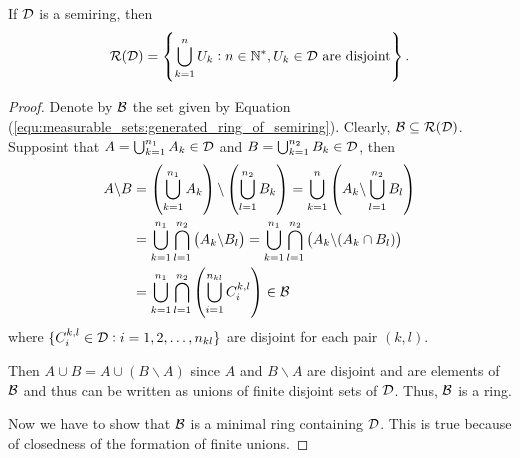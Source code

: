 \begin{thm}
If $\mathcal{D}$ is a semiring, then 
\begin{equation}
    \label{equ:measurable_sets:generated_ring_of_semiring}
    \mathcal{R}(\mathcal{D}) = \left\{ \bigcup_{k=1}^n U_k: 
    n \in \mathbb{N}^\ast, 
    U_k \in \mathcal{D} \text{ are disjoint} \right\}. 
\end{equation}
\end{thm}
\begin{proof}
Denote by $\mathcal{B}$ the set given by Equation 
(\ref{equ:measurable_sets:generated_ring_of_semiring}).
Clearly, $\mathcal{B} \subseteq \mathcal{R}(\mathcal{D})$. 
Supposint that $A = \bigcup_{k=1}^{n_1} A_k \in \mathcal{D}$ and 
$B = \bigcup_{k=1}^{n_2} B_k \in \mathcal{D}$, then 
\begin{equation*}
    \begin{aligned}
        A \backslash B 
        &= \left( \bigcup_{k=1}^{n_1}A_k \right) \backslash
        \left( \bigcup_{l=1}^{n_2}B_k \right) 
        = \bigcup_{k=1}^n \left( 
        A_k \backslash \bigcup_{l=1}^{n_2} B_l\right) \\
        &= \bigcup_{k=1}^{n_1} \bigcap_{l=1}^{n_2} 
        \left( A_k \backslash B_l \right) 
        = \bigcup_{k=1}^{n_1} \bigcap_{l=1}^{n_2} 
        \left( A_k \backslash (A_k \cap B_l) \right) \\ 
        &= \bigcup_{k=1}^{n_1} \bigcap_{l=1}^{n_2} 
        \left( \bigcup_{i=1}^{n_{kl}} C_i^{k, l} \right)
        \in \mathcal{B}
    \end{aligned}
\end{equation*}
where $\{C_i^{k, l} \in \mathcal{D} : i = 1, 2, \ldots, n_{kl}\}$ are disjoint for 
each pair $(k, l)$. 

Then $A \cup B = A \cup (B \backslash A)$ since $A$ and $B \backslash A$ 
are disjoint and are elements of $\mathcal{B}$ and thus can be written as unions 
of finite disjoint sets of $\mathcal{D}$. 
Thus, $\mathcal{B}$ is a ring. 

Now we have to show that $\mathcal{B}$ is a minimal ring containing $\mathcal{D}$. 
This is true because of closedness of the formation of finite unions. 
\end{proof}

